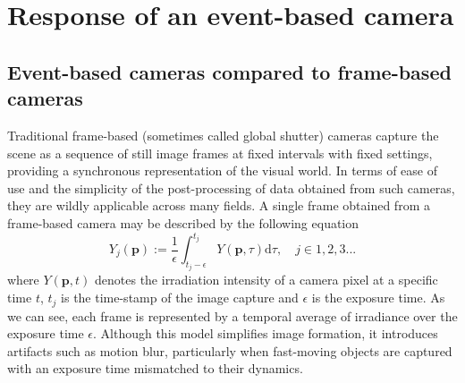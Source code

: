 
\chapter{Response of an event-based camera\label{chap:response}}

\section{Event-based cameras compared to frame-based cameras}

Traditional frame-based (sometimes called global shutter) cameras capture the scene as a sequence of still image frames at fixed intervals with fixed settings, providing a synchronous representation of the visual world. 
In terms of ease of use and the simplicity of the post-processing of data obtained from such cameras, they are wildly applicable across many fields.
A single frame obtained from a frame-based camera may be described by the following equation  \cite{scheerlinck2018event}
\begin{equation}
Y_j(\boldsymbol{p}) := \frac{1}{\epsilon} \int_{t_j - \epsilon}^{t_j} Y(\boldsymbol{p}, \tau) \mathrm{d} \tau, \quad j \in 1, 2, 3 ...
\label{eq:frame}
\end{equation}
where $Y(\boldsymbol{p}, t)$ denotes the irradiation intensity of a camera pixel at a specific time $t$, $t_j$ is the time-stamp of the image capture and $\epsilon$ is the exposure time.
As we can see, each frame is represented by a temporal average of irradiance over the exposure time $\epsilon$. Although this model simplifies image formation, it introduces artifacts such as motion blur, particularly when fast-moving objects are captured with an exposure time mismatched to their dynamics.

